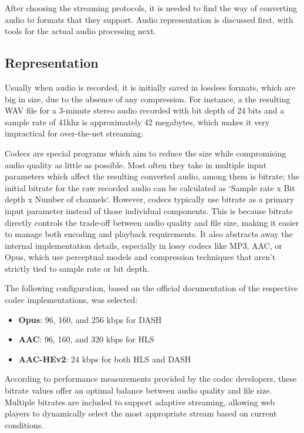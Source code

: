 After choosing the streaming protocols, it is needed to find the way of converting audio to formats that
they support. Audio representation is discussed first, with tools for the actual audio processing next.

\subsection{Representation}
Usually when audio is recorded, it is initially saved in lossless formats, which are big in size, due to
the absence of any compression. For instance, a the resulting WAV file for a 3-minute stereo audio
recorded with bit depth of 24 bits and a sample rate of 41khz is approximately 42 megabytes, which makes
it very impractical for over-the-net streaming.

Codecs are special programs which aim to reduce the size
while compromising audio quality as little as possible. Most often they take in multiple input parameters
which affect the resulting converted audio, among them is bitrate; the initial bitrate for the raw recorded audio
can be calculated as `Sample rate x Bit depth x Number of channels`.
However, codecs typically use bitrate as a primary input parameter instead of those individual components.
This is because bitrate directly controls the trade-off between audio quality and file size,
making it easier to manage both encoding and playback requirements.
It also abstracts away the internal implementation details, especially in lossy codecs like MP3, AAC, or Opus,
which use perceptual models and compression techniques that aren’t strictly tied to sample rate or bit depth.

The following configuration, based on the official documentation of the respective codec implementations, was selected:
\begin{itemize}[leftmargin=1.5cm]
    \item \textbf{Opus}: 96, 160, and 256 kbps for DASH
    \item \textbf{AAC}: 96, 160, and 320 kbps for HLS
    \item \textbf{AAC-HEv2}: 24 kbps for both HLS and DASH
\end{itemize}
According to performance measurements provided by the codec developers,
these bitrate values offer an optimal balance between audio quality and file size.
Multiple bitrates are included to support adaptive streaming,
allowing web players to dynamically select the most appropriate stream based on current conditions.


